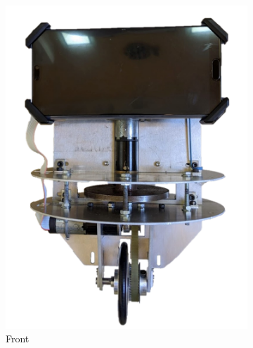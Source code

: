 \documentclass[twoside,twocolumn,12pt]{article}
\begin{document}
\clearpage
\begin{figure}
\centering
\begin{subfigure}[t]{0.49\textwidth}
    \includegraphics[width=\linewidth]{frontnewt}
   \caption{Front}
  \label{sub:frontnew}
  \end{subfigure}
  \begin{subfigure}[t]{0.49\textwidth}

\end{subfigure}
\end{figure}
\end{document}
